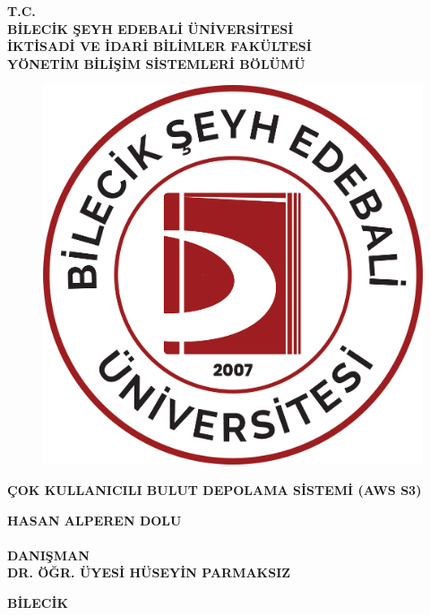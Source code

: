 \thispagestyle{empty}
    \begin{center}

    \textbf{T.C. \\BİLECİK ŞEYH EDEBALİ ÜNİVERSİTESİ \\ İKTİSADİ VE İDARİ BİLİMLER FAKÜLTESİ \\ YÖNETİM BİLİŞİM SİSTEMLERİ BÖLÜMÜ}
    \vspace{.75cm}
    
    \begin{figure}[h!]
    \centering
    \includegraphics[width=0.25\linewidth]{BSEU_LOGO.png}   
    \end{figure}
    
    \vspace{1.25cm}
    
    \textbf{ÇOK KULLANICILI BULUT DEPOLAMA SİSTEMİ (AWS S3)}

    \vspace{2cm}
    
    \textbf{HASAN ALPEREN DOLU} \\
    \textbf{} \\
    
    \vfill
    \textbf{DANIŞMAN} \\    
    \textbf{DR. ÖĞR. ÜYESİ HÜSEYİN PARMAKSIZ} \\
    
    \vspace{0.8cm}
    \textbf{}
    \vspace{0.8cm}
    
    
    \textbf{BİLECİK \the\year}
    \end{center}